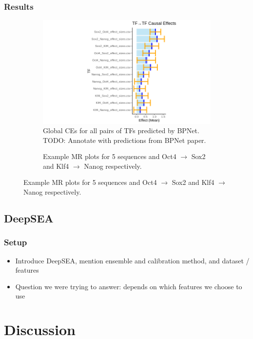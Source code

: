\documentclass[twoside,11pt]{article}
\begin{document}
\subsubsection{Results}%
\label{ssub:results}
\begin{figure}[htpb]
	\begin{subfigure}[t]{\textwidth}
		\centering		
		\includegraphics[width=0.8\linewidth]{fig/bpnet_tf_to_tf_global_ces}
		\caption{Global CEs for all pairs of TFs predicted by BPNet. TODO: Annotate with predictions from BPNet paper.}%
		\label{fig:bpnet_tf_to_tf_global_ces}
	\end{subfigure}

	\begin{subfigure}[t]{\textwidth}
		\caption{Example MR plots for 5 sequences and Oct4 \( \rightarrow \) Sox2 and Klf4 \( \rightarrow \) Nanog respectively.}
		\label{fig:bpnet_eff_size_pair_exs}
	\end{subfigure}
\end{figure}

\subsection{DeepSEA}%
\label{sub:deepsea}
\subsubsection{Setup}%
\label{ssub:deepsea_setup}

\begin{itemize}
	\item Introduce DeepSEA, mention ensemble and calibration method, and dataset / features
	\item Question we were trying to answer: depends on which features we choose to use
\end{itemize}

\section{Discussion}%
\label{sec:discussion}
\end{document}
